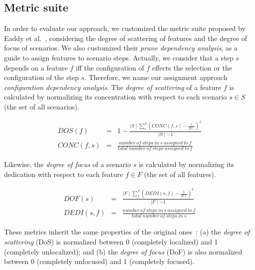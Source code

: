 \documentclass{sig-alt-full}
\begin{document}
\subsection{Metric suite}\label{sub:metric-suite}

In order to evaluate our approach, we customized the metric suite proposed by Eaddy et al.~\cite{Eaddy:2007aa},
considering the degree of scattering of features and the degree of focus of scenarios. We also customized their \emph{prune dependency analysis}, as a guide to
assign features to scenario steps. Actually, we consider that a step $s$ depends on a feature $f$ iff the configuration of $f$ effects the selection or the configuration of the step $s$. Therefore, we name our assignment approach
\emph{configuration dependency analysis}.  The \emph{degree of scattering} of a
feature $f$ is calculated by normalizing its concentration with respect to each
scenario $s \in S$ (the set of all scenarios).



%

\begin{small}
\begin{eqnarray*}
DOS(f)   & = & 1 - \frac{\mid S \mid \sum_{s}^{S}(CONC(f,s)-\frac{1}{\mid S \mid})^2}{\mid S \mid -1} \\
CONC(f,s) & = &  \frac{number\ of\ steps\ in\ s\ assigned\ to\ f}{total\ number\ of\ steps\ assigned\ to\ f}
\end{eqnarray*}
\end{small}

Likewise, the \emph{degree of focus} of a scenario $s$ is calculated by
normalizing its dedication with respect to each feature $f \in F$ (the set of
all features).

\begin{small}
\begin{eqnarray*}
DOF(s) & = & \frac{\mid F \mid \sum_{f}^{F}(DEDI(s,f)-\frac{1}{\mid F \mid})^2}{\mid F \mid -1} \\
DEDI(s,f) & = & \frac{number\ of\ steps\ in\ s\ assigned\ to\ f}{total\ number\ of\ steps\ in\ s}
\end{eqnarray*}
\end{small} 

These metrics inherit the same properties of the original
ones~\cite{Eaddy:2007aa}: (a) the
\emph{degree of scattering} (DoS) is normalized between 0 (completely localized)
and 1 (completely unlocalized); and (b) the \emph{degree of focus} (DoF) is also
normalized between 0 (completely unfocused) and 1 (completely focused).
\end{document}
